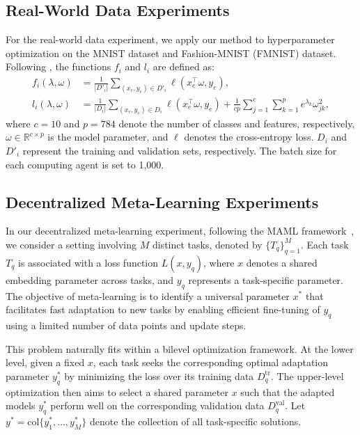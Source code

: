 \documentclass{article}
\theoremstyle{plain}
\theoremstyle{definition}
\theoremstyle{remark}
\begin{document}
\subsection{Real-World Data Experiments}\label{realesec}
For the real-world data experiment, we apply our method to hyperparameter optimization on the MNIST dataset \citep{lecun1998gradient} and Fashion-MNIST (FMNIST) \citep{xiao2017fashion} dataset. Following \citep{grazzi2020iteration}, the functions \(f_i\) and \(l_i\) are defined as:
\begin{align}
    f_i(\lambda, \omega) &= \frac{1}{|D'_i|} \sum_{(x_e, y_e) \in D'_i} \ell(x_e^\top \omega, y_e), \nonumber\\
    l_i(\lambda, \omega) &= \frac{1}{|D_i|} \sum_{(x_e, y_e) \in D_i} \ell(x_e^\top \omega, y_e) + \frac{1}{cp} \sum_{j=1}^c \sum_{k=1}^p e^{\lambda_k} \omega_{jk}^2,\nonumber
\end{align}
where \(c=10\) and \(p=784\) denote the number of classes and features, respectively, \(\omega \in \mathbb{R}^{c \times p}\) is the model parameter, and \(\ell\) denotes the cross-entropy loss. \(D_i\) and \(D'_i\) represent the training and validation sets, respectively. The batch size for each computing agent is set to 1,000.

\subsection{Decentralized Meta-Learning Experiments}\label{dmetasec}
In our decentralized meta-learning experiment, following the MAML framework~\citep{finn2017model}, we consider a setting involving \(M\) distinct tasks, denoted by \(\{T_q\}_{q=1}^M\). Each task \(T_q\) is associated with a loss function \(L(x, y_q)\), where \(x\) denotes a shared embedding parameter across tasks, and \(y_q\) represents a task-specific parameter. The objective of meta-learning is to identify a universal parameter \(x^*\) that facilitates fast adaptation to new tasks by enabling efficient fine-tuning of \(y_q\) using a limited number of data points and update steps.

This problem naturally fits within a bilevel optimization framework. At the lower level, given a fixed \(x\), each task seeks the corresponding optimal adaptation parameter \(y_q^*\) by minimizing the loss over its training data \(D_q^{\text{tr}}\). The upper-level optimization then aims to select a shared parameter \(x\) such that the adapted models \(y_q^*\) perform well on the corresponding validation data \(D_q^{\text{val}}\). Let \(y^* = \text{col}\{y_1^*, \dots, y_M^*\}\) denote the collection of all task-specific solutions.
\end{document}
